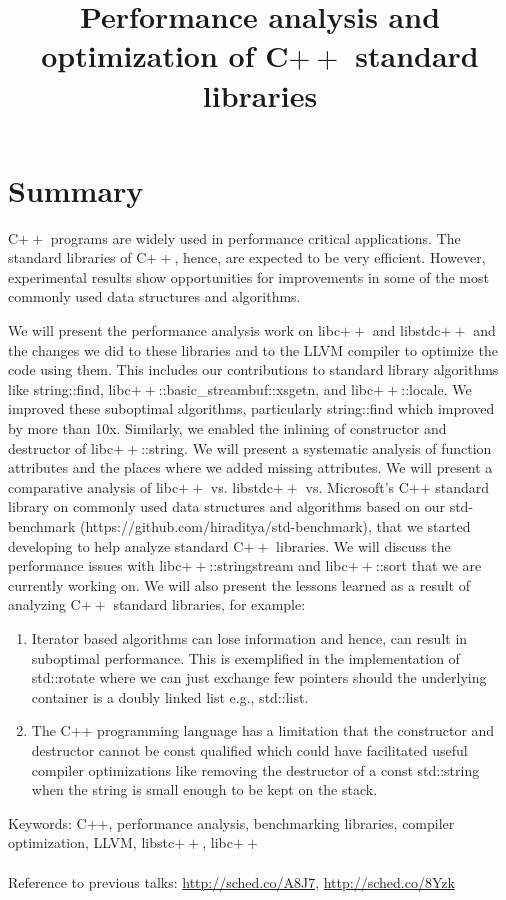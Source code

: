 \documentclass[10pt]{article}
\begin{document}
\title{Performance analysis and optimization of C$++$ standard libraries}


\date{}
\maketitle

\section*{Summary}
C$++$ programs are widely used in performance critical applications. The standard
libraries of C$++$, hence, are expected to be very efficient. However,
experimental results show opportunities for improvements in some of the most
commonly used data structures and algorithms.

We will present the performance analysis work on libc$++$ and libstdc$++$ and
the changes we did to these libraries and to the LLVM compiler to optimize the
code using them. This includes our contributions to standard library algorithms
like string::find, libc$++$::basic\_streambuf::xsgetn, and libc$++$::locale. We
improved these suboptimal algorithms, particularly string::find which improved
by more than 10x. Similarly, we enabled the inlining of constructor and
destructor of libc$++$::string. We will present a systematic analysis of
function attributes and the places where we added missing attributes. We will
present a comparative analysis of libc$++$ vs. libstdc$++$ vs. Microsoft's C++
standard library on commonly used data structures and algorithms based on our
std-benchmark (https://github.com/hiraditya/std-benchmark), that we started
developing to help analyze standard C$++$ libraries. We will discuss the
performance issues with libc$++$::stringstream and libc$++$::sort that we are
currently working on. We will also present the lessons learned as a result of
analyzing C$++$ standard libraries, for example:
\begin{enumerate}
\item Iterator based algorithms can lose information and hence, can result in
  suboptimal performance.  This is exemplified in the implementation of
  std::rotate where we can just exchange few pointers should the underlying
  container is a doubly linked list e.g., std::list.
\item The C++ programming language has a limitation that the constructor and
  destructor cannot be const qualified which could have facilitated useful
  compiler optimizations like removing the destructor of a const std::string
  when the string is small enough to be kept on the stack.
\end{enumerate}

Keywords: C++, performance analysis, benchmarking libraries, compiler
optimization, LLVM, libstc$++$, libc$++$
\\
\\
Reference to previous talks: \url{http://sched.co/A8J7}, \url{http://sched.co/8Yzk}
\end{document}
